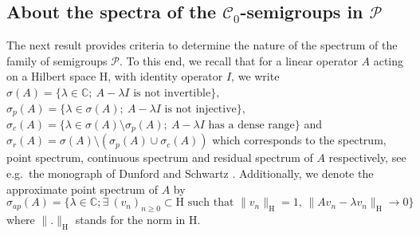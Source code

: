 \documentclass[12pt]{amsart}
\numberwithin{equation}{section}
\newcommand{\bb}{\mathbb}
\newcommand{\ccP}{\mathscr{P}}
\renewcommand{\geq}{\geqslant}
\newcommand{\rH}{\mathrm{H}}
\theoremstyle{definition}
\theoremstyle{assump}
\theoremstyle{remark}
\begin{document}
\subsection{About the spectra of the $\mathcal{C}_0$-semigroups in $\ccP$}
The next result provides criteria  to determine the nature of the spectrum of the family of semigroups  $\ccP$. To this end, we recall that for a linear operator $A$ acting on a Hilbert space $\rH$, with identity operator $I$, we write $\sigma(A)=\{\lambda \in \bb{C}; \: A-\lambda I \textrm{ is not invertible} \},$ $\sigma_p(A)=\{\lambda \in \sigma(A); \: A-\lambda I \textrm{ is not injective} \},$ $\sigma_c(A)=\{\lambda \in \sigma(A)\setminus\sigma_p(A); \: A-\lambda I \textrm{ has a dense range} \}$  and $\sigma_r(A)=\sigma(A)\setminus (\sigma_p(A) \cup \sigma_c(A))$ which corresponds to the spectrum, point spectrum, continuous spectrum and residual spectrum of $A$ respectively, see e.g.~the monograph of Dunford and  Schwartz \cite[XV.8]{DS}. Additionally, we denote the approximate point spectrum of $A$ by \[\sigma_{ap}(A)=\{\lambda\in\bb{C}; \exists \:  (v_n)_{n\geq0} \subset \rH \mbox{ such that $\|v_n\|_{\rH}=1$, $\|Av_n-\lambda v_n\|_{\rH}\to 0$}\}\]
where $\|.\|_{\rH}$ stands for the norm in $\rH$.
\end{document}
